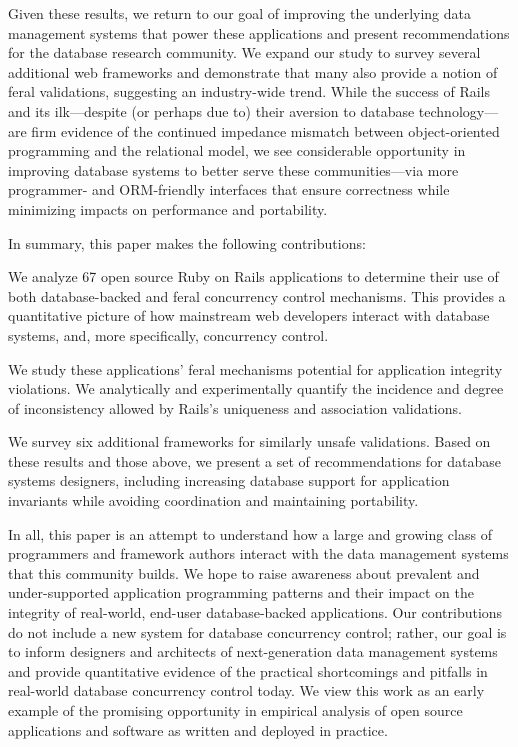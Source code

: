 Given these results, we return to our goal of improving the underlying
data management systems that power these applications and present
recommendations for the database research community. We expand our
study to survey several additional web frameworks and demonstrate that
many also provide a notion of feral validations, suggesting an
industry-wide trend. While the success of Rails and its ilk---despite
(or perhaps due to) their aversion to database technology---are firm
evidence of the continued impedance mismatch between object-oriented
programming and the relational model, we see considerable opportunity
in improving database systems to better serve these communities---via
more programmer- and ORM-friendly interfaces that ensure correctness
while minimizing impacts on performance and portability.

In summary, this paper makes the following contributions:
\begin{myitemize}
\item We analyze 67 open source Ruby on Rails applications to
  determine their use of both database-backed and feral concurrency
  control mechanisms. This provides a quantitative picture of how
  mainstream web developers interact with database systems, and, more
  specifically, concurrency control.

\item We study these applications' feral mechanisms potential for
  application integrity violations. We analytically and experimentally
  quantify the incidence and degree of inconsistency allowed by
  Rails's uniqueness and association validations.

\item We survey six additional frameworks for similarly unsafe
  validations. Based on these results and those above, we present a
  set of recommendations for database systems designers, including
  increasing database support for application invariants while avoiding
  coordination and maintaining portability.
\end{myitemize}

In all, this paper is an attempt to understand how a large and growing
class of programmers and framework authors interact with the data
management systems that this community builds. We hope to raise
awareness about prevalent and under-supported application programming
patterns and their impact on the integrity of real-world, end-user
database-backed applications. Our contributions do not include a new
system for database concurrency control; rather, our goal is to
inform designers and architects of next-generation data
management systems and provide quantitative evidence of the practical
shortcomings and pitfalls in real-world database concurrency control
today. We view this work as an early example of the promising
opportunity in empirical analysis of open source applications and
software as written and deployed in practice.

